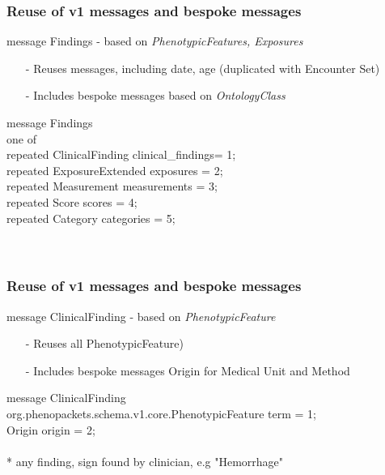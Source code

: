 \documentclass{beamer}
\begin{document}

\begin{frame}
\frametitle{Reuse of v1 messages and bespoke messages}
\begin{block}{message Findings - based on \textit{PhenotypicFeatures, Exposures}}
\begin{itemize}
\item[-] Reuses messages, including date, age (duplicated with Encounter Set)
\item[-] Includes bespoke messages based on \textit{OntologyClass}
\end{itemize}
\end{block}

message \colorbox{yellow!80}{Findings} \ { \\
    one of \ { \\
        repeated \colorbox{yellow!80}{ClinicalFinding} clinical\_findings= 1; \\
        repeated \colorbox{yellow!80}{ExposureExtended} exposures = 2; \\
        repeated \colorbox{yellow!80}{Measurement} measurements = 3; \\
        repeated \colorbox{yellow!80}{Score} scores = 4; \\
        repeated \colorbox{yellow!80}{Category} categories = 5; \\
   \ } \\
\ } \\
\end{frame}




\begin{frame}
\frametitle{Reuse of v1 messages and bespoke messages}
\begin{block}{message ClinicalFinding - based on \textit{PhenotypicFeature}}
\begin{itemize}
\item[-] Reuses all PhenotypicFeature)
\item[-] Includes bespoke messages Origin for Medical Unit and Method 
\end{itemize}
\end{block}

message \colorbox{yellow!80}{ClinicalFinding} \ { \\
    org.phenopackets.schema.v1.core.PhenotypicFeature term = 1; \\
    \colorbox{yellow!80}{Origin} origin = 2; \\
\ } \\
{\color{blue}* any finding, sign found by clinician, e.g "Hemorrhage"} 

\end{frame}
\end{document}
